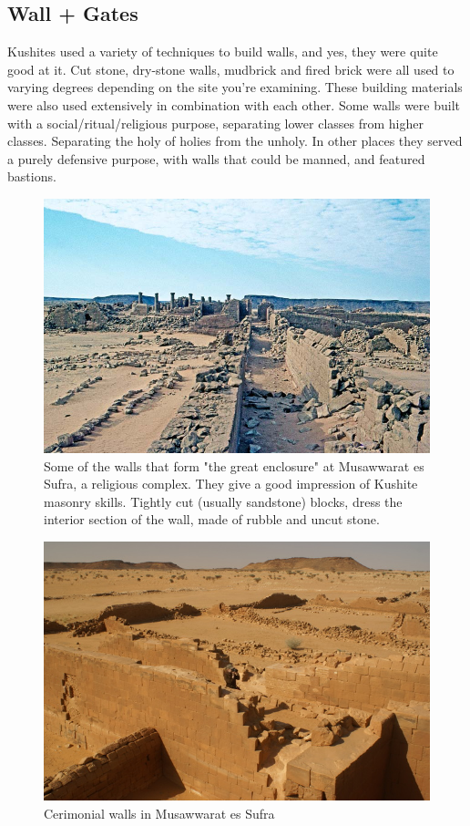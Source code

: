 \documentclass[a4paper,12pt]{scrreprt}
\begin{document}
\subsection{Wall + Gates}

Kushites used a variety of techniques to build walls, and yes, they were quite good at it. Cut stone, dry-stone walls, mudbrick and fired brick were all used to varying degrees depending on the site you’re examining. These building materials were also used extensively in combination with each other. Some walls were built with a social/ritual/religious purpose, separating lower classes from higher classes. Separating the holy of holies from the unholy. In other places they served a purely defensive purpose, with walls that could be manned, and featured bastions.

\begin{figure}[H]
	\centering
	\includegraphics[width=\textwidth]{img/walls_gates/impression_of_wall}
	\caption{Some of the walls that form "the great enclosure" at Musawwarat es Sufra, a religious complex. They give a good impression of Kushite masonry skills. Tightly cut (usually sandstone) blocks, dress the interior section of the wall, made of rubble and uncut stone.}
\end{figure}

\begin{figure}[H]
	\centering
	\includegraphics[width=\textwidth]{img/walls_gates/cermonial_wall}
	\caption{Cerimonial walls in Musawwarat es Sufra}
\end{figure}
\end{document}
